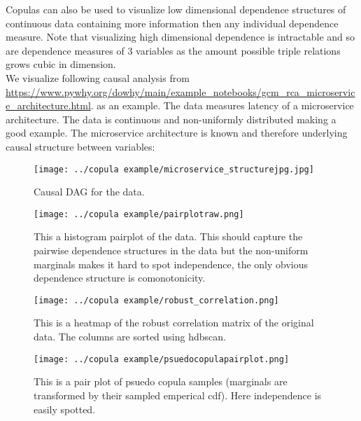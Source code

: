 \documentclass[a4paper,12pt]{article}
\begin{document}
Copulas can also be used to visualize low dimensional dependence structures of continuous data containing more
information then any individual dependence measure. Note that visualizing high dimensional dependence is
intractable and so are dependence measures of $3$ variables as the amount possible triple relations grows
cubic in dimension. \\

We visualize following causal analysis from \url{https://www.pywhy.org/dowhy/main/example_notebooks/gcm_rca_microservice_architecture.html}.
as an example. The data measures latency of a microservice architecture. The data is continuous and non-uniformly distributed making a good
example. The microservice architecture is known and therefore underlying causal structure between variables:

\begin{figure}[h]
    \centering
    \texttt{[image: ../copula example/microservice\_structurejpg.jpg]}
    \caption{Causal DAG for the data.}
    \label{fig:../copula example/microservice_structurejpg.jpg}
\end{figure}


\begin{figure}[h]
    \centering
    \texttt{[image: ../copula example/pairplotraw.png]}
    \caption{ This a histogram pairplot of the data. This should capture the pairwise dependence structures in the data
        but the non-uniform marginals makes it hard to spot independence, the only obvious dependence structure is
        comonotonicity.}
    \label{fig:rawpairplot}
\end{figure}

\begin{figure}[h]
    \centering
    \texttt{[image: ../copula example/robust\_correlation.png]}
    \caption{
        This is a heatmap of the robust correlation matrix of the original data. The columns are sorted
        using hdbscan.
    }
    \label{fig:robust correlation}
\end{figure}

\begin{figure}[h]
    \centering
    \texttt{[image: ../copula example/psuedocopulapairplot.png]}
    \caption{
        This is a pair plot of psuedo copula samples (marginals are transformed by their sampled emperical cdf).
        Here independence is easily spotted.
    }
    \label{fig:pair plot psuedo copula}
\end{figure}

\newpage
\printbibliography
\end{document}
